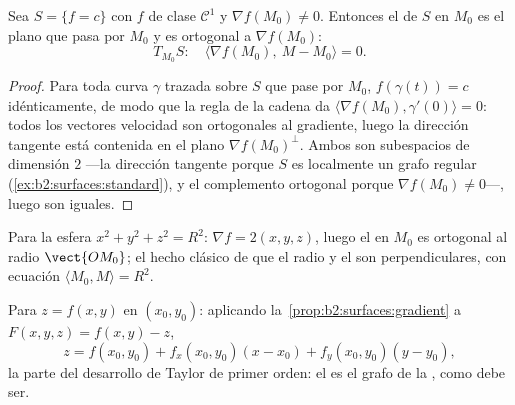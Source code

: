 \begin{proposition}\label{prop:b2:surfaces:gradient}
Sea $S = \{f = c\}$ con $f$ de clase $\mathcal{C}^1$ y $\nabla
f(M_0) \neq 0$. Entonces el  de $S$ en $M_0$ es el
plano que pasa por $M_0$ y es ortogonal a $\nabla f(M_0)$:
\[
T_{M_0}S :\quad
\langle \nabla f(M_0),\ M - M_0\rangle = 0 .
\]
\end{proposition}

\begin{proof}
Para toda curva $\gamma$ trazada sobre $S$ que pase por $M_0$,
$f(\gamma(t)) = c$ idénticamente, de modo que la regla de la cadena
da $\langle \nabla f(M_0), \gamma'(0)\rangle = 0$: todos los vectores
velocidad son ortogonales al gradiente, luego la dirección tangente
está contenida en el plano $\nabla f(M_0)^\perp$. Ambos son
subespacios de dimensión $2$ ---la dirección tangente porque $S$ es
localmente un grafo regular (\cref{ex:b2:surfaces:standard}), y el
complemento ortogonal porque $\nabla f(M_0) \neq 0$---, luego son
iguales.
\end{proof}

\begin{example}\label{ex:b2:surfaces:spheretangent}
Para la esfera $x^2 + y^2 + z^2 = R^2$: $\nabla f = 2(x, y, z)$,
luego el  en $M_0$ es ortogonal al radio $\vect{OM_0}$;
el hecho clásico de que el radio y el  son
perpendiculares, con ecuación $\langle M_0, M\rangle = R^2$.
\end{example}

\begin{example}\label{ex:b2:surfaces:graphtangent}
Para $z = f(x, y)$ en $(x_0, y_0)$: aplicando la~\cref{prop:b2:surfaces:gradient} a $F(x,y,z) = f(x,y) - z$,
\[
z = f(x_0, y_0)
+ f_x(x_0, y_0)(x - x_0)
+ f_y(x_0, y_0)(y - y_0) ,
\]
la parte  del desarrollo de Taylor de primer orden: el
 es el grafo de la , como debe ser.
\end{example}

